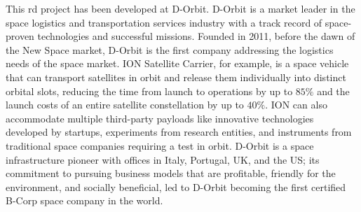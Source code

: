 This \acrshort{rd} project has been developed at D-Orbit. D-Orbit is a market leader in the space logistics and transportation services industry with a track record of space-proven technologies and successful missions. Founded in 2011, before the dawn of the New Space market, D-Orbit is the first company addressing the logistics needs of the space market. ION Satellite Carrier, for example, is a space vehicle that can transport satellites in orbit and release them individually into distinct orbital slots, reducing the time from launch to operations by up to $85\%$ and the launch costs of an entire satellite constellation by up to $40\%$. ION can also accommodate multiple third-party payloads like innovative technologies developed by startups, experiments from research entities, and instruments from traditional space companies requiring a test in orbit.
D-Orbit is a space infrastructure pioneer with offices in Italy, Portugal, UK, and the US; its commitment to pursuing business models that are profitable, friendly for the environment, and socially beneficial, led to D-Orbit becoming the first certified B-Corp space company in the world.
